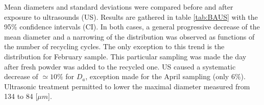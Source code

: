 
 \begin{center}
\begin{table}[ht]
\noindent{}

\caption[Powder samplings recycling conditions]{Powder samplings recycling conditions}
\label{tab:detcyc}
\end{table}
 \end{center}

Mean diameters and standard deviations were compared before and after exposure to ultrasounds (US). Results are gathered in table \ref{tab:BAUS} with the 95\% confidence intervals (CI). In both cases, a general progressive decrease of the mean diameter and a narrowing of the distribution was observed as functions of the number of recycling cycles. The only exception to this trend is the distribution for February sample. This particular sampling was made the day after fresh powder was added to the recycled one. US caused a systematic decrease of $\simeq 10\%$ for $D_a$, exception made for the April sampling (only $6\%$). Ultrasonic treatment permitted to lower the maximal diameter measured from 134 to 84 [$\mu m$].  \\

